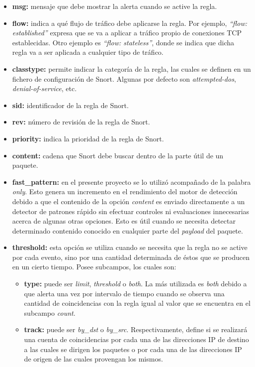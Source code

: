 \begin{itemize}
\item{\textbf{msg:}} mensaje que debe mostrar la alerta cuando se active la regla.
\item{\textbf{flow:}} indica a qué flujo de tráfico debe aplicarse la regla. Por ejemplo, \textit{“flow: established”} expresa que se va a aplicar a tráfico propio de conexiones TCP establecidas. Otro ejemplo es \textit{“flow: stateless”}, donde se indica que dicha regla va a ser aplicada a cualquier tipo de tráfico.
\item{\textbf{classtype:}} permite indicar la categoría de la regla, las cuales se definen en un fichero de configuración de Snort. Algunas por defecto son \textit{attempted-dos}, \textit{denial-of-service},  etc.
\item{\textbf{sid:}} identificador de la regla de Snort.
\item{\textbf{rev:}} número de revisión de la regla de Snort.
\item{\textbf{priority:}} indica la prioridad de la regla de Snort.
\item{\textbf{content:}} cadena que Snort debe buscar dentro de la parte útil de un paquete.
\item{\textbf{fast\_pattern:}} en el presente proyecto se lo utilizó acompañado de la palabra \textit{only}. Esto genera un incremento en el rendimiento del motor de detección debido a que el contenido de la opción \textit{content} es enviado directamente a un detector de patrones rápido sin efectuar controles ni evaluaciones innecesarias acerca de algunas otras opciones. Esto es útil cuando se necesita detectar determinado contenido conocido en cualquier parte del \textit{payload} del paquete.
\item{\textbf{threshold:}} esta opción se utiliza cuando se necesita que la regla no se active por cada evento, sino por una cantidad determinada de éstos que se producen en un cierto tiempo. Posee subcampos, los cuales son:
\begin{itemize}
\item{\textbf{type:}} puede ser \textit{limit}, \textit{threshold} o \textit{both}. La más utilizada es \textit{both} debido a que alerta una vez por intervalo de tiempo cuando se observa una cantidad de coincidencias con la regla igual al valor que se encuentra en el subcampo \textit{count}. 
\item{\textbf{track:}} puede ser \textit{by\_dst} o \textit{by\_src}. Respectivamente, define si se realizará una cuenta de coincidencias por cada una de las direcciones IP de destino a las cuales se dirigen los paquetes o por cada una de las direcciones IP de origen de las cuales provengan los mismos.

\end{itemize}
\end{itemize}
